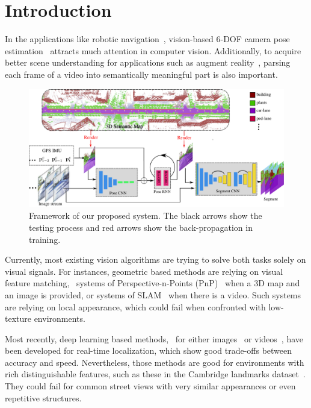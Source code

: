 \section{Introduction}
\label{sec:introduction}
In the applications like robotic navigation~\cite{ohno2003outdoor}, vision-based 6-DOF camera pose estimation~\cite{campbell2017globally,moreno2008pose,Kendall_2015_ICCV,coskun2017long} attracts much attention in computer vision.
Additionally, to acquire better scene understanding for applications such as augment reality~\cite{DBLP:journals/corr/abs-1708-05006}, parsing each frame of a video into semantically meaningful part is also important.

\begin{figure}[t]
\includegraphics[width=\textwidth]{fig/framework.pdf}
   \caption{Framework of our proposed system. The black arrows show the testing process and red arrows show the back-propagation in training.}
\label{fig:framework}
\end{figure}

Currently, most existing vision algorithms are trying to solve both tasks solely on visual signals.
For instances, geometric based methods are relying on visual feature matching, \eg~systems of Perspective-n-Points (PnP)~\cite{haralick1994review,kneip2014upnp,campbell2017globally} when a 3D map and an image is provided, or systems of SLAM~\cite{engel2014lsd,mur2015orb,NewcombeLD11} when there is a video. Such systems are relying on local appearance, which could fail when confronted with low-texture environments.

Most recently, deep learning based methods, \eg~for either images~\cite{Kendall_2015_ICCV} or videos~\cite{DBLP:journals/corr/ClarkWMTW17}, have been developed for real-time localization, which show good trade-offs between accuracy and speed.
Nevertheless, those methods are good for environments with rich distinguishable features, such as these in the Cambridge landmarks dataset~\cite{Kendall_2015_ICCV}. They could fail for common street views with very similar appearances or even repetitive structures. 

